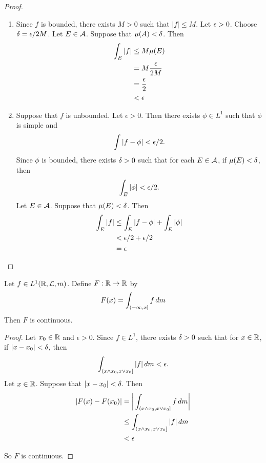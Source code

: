 \documentclass{book}
\begin{document}
	\begin{proof}\
		\begin{enumerate}
			\item Since $f$ is bounded, there exists $M >0$ such that $|f| \leq M$. Let $\epsilon >0$. Choose $\delta = \epsilon/2M$. Let $E \in \mathcal{A}$. Suppose that $\mu(A) < \delta$. Then 
			\begin{align*}
				\int_E|f| 
				& \leq M \mu(E)\\
				&= M\frac{\epsilon}{2M}\\
				&= \frac{\epsilon}{2}\\
				&< \epsilon
			\end{align*}
			
			\item Suppose that $f$ is unbounded. Let $\epsilon >0$. Then there exists $\phi \in L^1$ such that $\phi$ is simple and 
			$$\int|f-\phi| < \epsilon/2.$$ 
			Since $\phi$ is bounded, there exists $\delta >0 $ such that for each $E \in \mathcal{A}$, if $\mu(E) < \delta$, then 
			$$\int_E |\phi| < \epsilon/2.$$ 
			Let $E \in \mathcal{A}$. Suppose that $\mu(E) < \delta$. Then 
			\begin{align*}
				\int_E|f|
				& \leq \int_E |f-\phi| + \int_E |\phi|\\
				& < \epsilon/2 + \epsilon/2\\
				& = \epsilon
			\end{align*} 
		\end{enumerate}  
	\end{proof}
	
	\begin{ex}  
		Let $f \in L^1(\mathbb{R}, \mathcal{L}, m)$. Define $F: \mathbb{R} \rightarrow \mathbb{R}$ by $$F(x) = \int_{(-\infty,x]}f \, d m$$
		Then $F$ is continuous.
	\end{ex}
	
	\begin{proof}
		Let $x_0 \in \mathbb{R}$ and $\epsilon >0$. Since $f \in L^1$, there exists $\delta >0$ such that for $x \in \mathbb{R}$, if $|x-x_0| < \delta$, then $$\int_{(x \wedge x_0,x \vee x_0]}|f| \, d m < \epsilon.$$ Let $x \in \mathbb{R}$. Suppose that $|x-x_0|< \delta$. Then 
		\begin{align*}
			|F(x)-F(x_0)|
			&= \bigg|\int_{(x \wedge x_0,x \vee x_0]}f \, d m \bigg|\\
			& \leq \int_{(x \wedge x_0,x \vee x_0]}|f| \, d m \\
			& < \epsilon
		\end{align*} 
		
		So $F$ is continuous.
		
	\end{proof}
	
\end{document}
